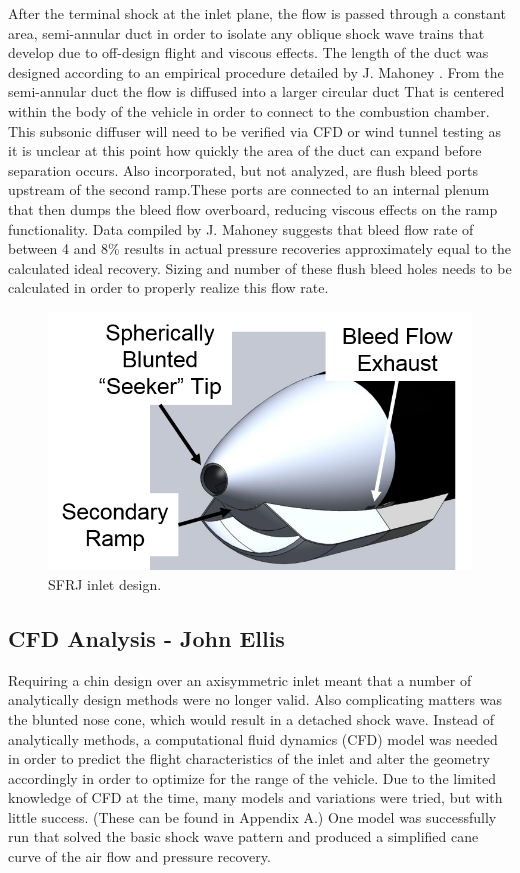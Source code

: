 After the terminal shock at the inlet plane, the flow is passed through a constant area, semi-annular duct in order to isolate any oblique shock wave trains that develop due to off-design flight and viscous effects. The length of the duct was designed according to an empirical procedure detailed by J. Mahoney \cite{mahoney_1991}. From the semi-annular duct the flow is diffused into a larger circular duct That is centered within the body of the vehicle in order to connect to the combustion chamber. This subsonic diffuser will need to be verified via CFD or wind tunnel testing as it is unclear at this point how quickly the area of the duct can expand before separation occurs. Also incorporated, but not analyzed, are flush bleed ports upstream of the second ramp.These ports are connected to an internal plenum that then dumps the bleed flow overboard, reducing viscous effects on the ramp functionality. Data compiled by J. Mahoney suggests that bleed flow rate of between 4 and 8\% results in actual pressure recoveries approximately equal to the calculated ideal recovery. Sizing and number of these flush bleed holes needs to be calculated in order to properly realize this flow rate.

\begin{figure}[H]
\centering
\includegraphics[width=.65\textwidth]{JWE_Figures/Nose_CAD_Iso.png}
\caption{SFRJ inlet design.}
\label{fig:InletGeom}
\end{figure}

\subsection{CFD Analysis - John Ellis}
Requiring a chin design over an axisymmetric inlet meant that a number of analytically design methods were no longer valid. Also complicating matters was the blunted nose cone, which would result in a detached shock wave. Instead of analytically methods, a computational fluid dynamics (CFD) model was needed in order to predict the flight characteristics of the inlet and alter the geometry accordingly in order to optimize for the range of the vehicle. Due to the limited knowledge of CFD at the time, many models and variations were tried, but with little success. (These can be found in Appendix A.) One model was successfully run that solved the basic shock wave pattern and produced a simplified cane curve of the air flow and pressure recovery.

